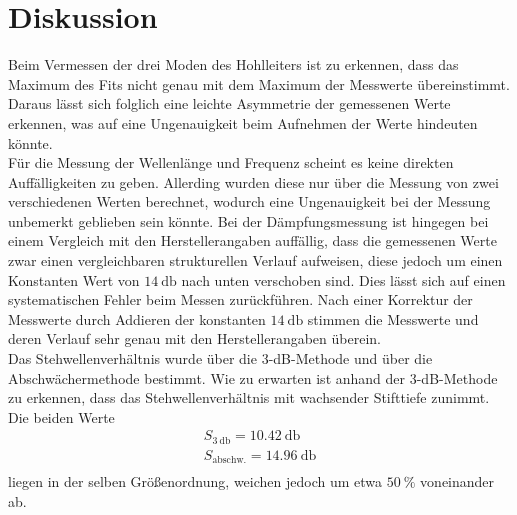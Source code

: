 \section{Diskussion}
\label{sec:Diskussion}

Beim Vermessen der drei Moden des Hohlleiters ist zu erkennen, dass das Maximum des Fits nicht genau mit dem Maximum der Messwerte übereinstimmt.
Daraus lässt sich folglich eine leichte Asymmetrie der gemessenen Werte erkennen, was auf eine Ungenauigkeit beim Aufnehmen der Werte hindeuten könnte.
\\
Für die Messung der Wellenlänge und Frequenz scheint es keine direkten Auffälligkeiten zu geben. Allerding wurden diese nur über die Messung von 
zwei verschiedenen Werten berechnet, wodurch eine Ungenauigkeit bei der Messung unbemerkt geblieben sein könnte. Bei der Dämpfungsmessung ist 
hingegen bei einem Vergleich mit den Herstellerangaben auffällig, dass die gemessenen Werte zwar einen vergleichbaren strukturellen Verlauf 
aufweisen, diese jedoch um einen Konstanten Wert von $\SI{14}{\decibel}$ nach unten verschoben sind. Dies lässt sich auf einen systematischen 
Fehler beim Messen zurückführen. Nach einer Korrektur der Messwerte durch Addieren der konstanten $\SI{14}{\decibel}$ stimmen die Messwerte und 
deren Verlauf sehr genau mit den Herstellerangaben überein. 
\\
Das Stehwellenverhältnis wurde über die 3-dB-Methode und über die Abschwächermethode bestimmt. Wie zu erwarten ist anhand der 3-dB-Methode zu erkennen, 
dass das Stehwellenverhältnis mit wachsender Stifttiefe zunimmt. 
Die beiden Werte 
\begin{align*}
    S_{\SI{3}{\decibel}} = \SI{10.42}{\decibel} \\
    S_{\text{abschw.}} = \SI{14.96}{\decibel} \\
\end{align*}
liegen in der selben Größenordnung, weichen jedoch um etwa $\SI{50}{\percent}$ voneinander ab. 